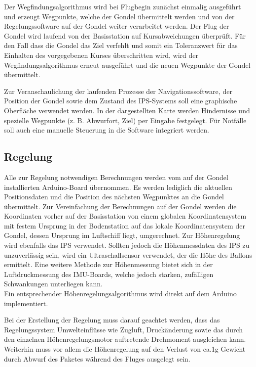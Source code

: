 \documentclass[lang=ngerman,inputenc=utf8,fontsize=10pt]{ldvarticle}
\begin{document}
Der Wegfindungsalgorithmus wird bei Flugbegin zunächst einmalig ausgeführt und erzeugt Wegpunkte, welche der Gondel übermittelt werden und von der Regelungssoftware auf der Gondel weiter verarbeitet werden. Der Flug der Gondel wird laufend von der Basisstation auf Kursabweichungen überprüft. Für den Fall dass die Gondel das Ziel verfehlt und somit ein Toleranzwert für das Einhalten des vorgegebenen Kurses überschritten wird, wird der Wegfindungsalgorithmus erneut ausgeführt und die neuen Wegpunkte der Gondel übermittelt.


Zur Veranschaulichung der laufenden Prozesse der Navigationssoftware, der Position der Gondel sowie dem Zustand des IPS-Systems soll eine graphische Oberfläche verwendet werden. In der dargestellten Karte werden Hindernisse und spezielle Wegpunkte (z. B. Abwurfort, Ziel) per Eingabe festgelegt. Für Notfälle soll auch eine manuelle Steuerung in die Software integriert werden.
\subsection*{Regelung}
Alle zur Regelung notwendigen Berechnungen werden vom auf der Gondel installierten Arduino-Board übernommen. Es werden lediglich die aktuellen Positionsdaten und die Position des nächsten Wegpunktes an die Gondel übermittelt. Zur Vereinfachung der Berechnungen auf der Gondel werden die Koordinaten vorher auf der Basisstation von einem globalen Koordinatensystem mit festem Ursprung in der Bodenstation auf das lokale Koordinatensystem der Gondel, dessen Ursprung  im Luftschiff liegt, umgerechnet. Zur Höhenregelung wird ebenfalls das IPS verwendet. Sollten jedoch die Höhenmessdaten des IPS zu unzuverlässig sein, wird ein Ultraschallsensor verwendet, der die Höhe des Ballons ermittelt. Eine weitere Methode zur Höhenmessung bietet sich in der Luftdruckmessung des IMU-Boards, welche jedoch starken, zufälligen Schwankungen unterliegen kann.\\ Ein entsprechender Höhenregelungsalgorithmus wird direkt auf dem Arduino implementiert.


Bei der Erstellung der Regelung muss darauf geachtet werden, dass das Regelungssystem Umwelteinflüsse wie Zugluft, Druckänderung sowie das durch den einzelnen Höhenregelungsmotor auftretende Drehmoment ausgleichen kann. Weiterhin muss vor allem die Höhenregelung auf den Verlust von ca.1g Gewicht durch Abwurf des Paketes während des Fluges ausgelegt sein.
\end{document}
